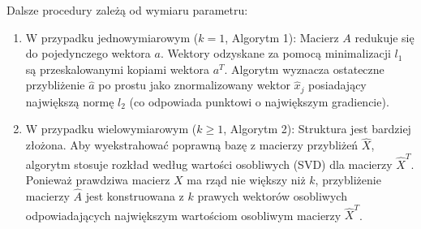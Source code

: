 Dalsze procedury zależą od wymiaru parametru:
\begin{enumerate}
    \item W przypadku jednowymiarowym ($k=1$, Algorytm 1): Macierz $A$ redukuje się do pojedynczego wektora $a$. Wektory odzyskane za pomocą minimalizacji $l_1$ są przeskalowanymi kopiami wektora $a^T$. Algorytm wyznacza ostateczne przybliżenie $\hat{a}$ po prostu jako znormalizowany wektor $\hat{x}_j$ posiadający największą normę $l_2$ (co odpowiada punktowi o największym gradiencie).
    \item W przypadku wielowymiarowym ($k \ge 1$, Algorytm 2): Struktura jest bardziej złożona. Aby wyekstrahować poprawną bazę z macierzy przybliżeń $\hat{X}$, algorytm stosuje rozkład według wartości osobliwych (SVD) dla macierzy $\hat{X}^T$. Ponieważ prawdziwa macierz $X$ ma rząd nie większy niż $k$, przybliżenie macierzy $\hat{A}$ jest konstruowana z $k$ prawych wektorów osobliwych odpowiadających największym wartościom osobliwym macierzy $\hat{X}^T$.
\end{enumerate}
